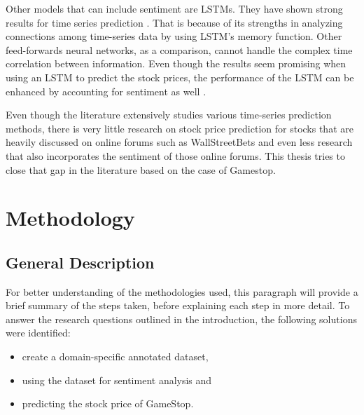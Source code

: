 \documentclass[11pt, a4paper]{article}
\begin{document}
Other models that can include sentiment are LSTMs. They have shown strong results for time series prediction \citep{rammurthy2021lstm}. That is because of its strengths in 
analyzing connections among time-series data by using LSTM's memory function. Other feed-forwards neural networks, as a comparison, cannot handle the complex 
time correlation between information. Even though the results seem promising when using an LSTM to predict the stock prices, the performance of the LSTM 
can be enhanced by accounting for sentiment as well \citep{jin2020lstmsentiment, wang2019forecasting}.

Even though the literature extensively studies various time-series prediction methods, there is very little research on stock price prediction for stocks that are heavily discussed on
online forums such as WallStreetBets and even less research that also incorporates the sentiment of those online forums. This thesis tries to close that gap in the literature based
on the case of Gamestop.



\section{Methodology}

\subsection{General Description} \label{general_description}

For better understanding of the methodologies used, this paragraph will provide a brief summary of the steps taken, before
explaining each step in more detail. To answer the research questions outlined in the introduction, the following solutions
were identified:
\begin{itemize}
    \item create a domain-specific annotated dataset, 
    \item using the dataset for sentiment analysis and
    \item predicting the stock price of GameStop.
\end{itemize}
\end{document}
